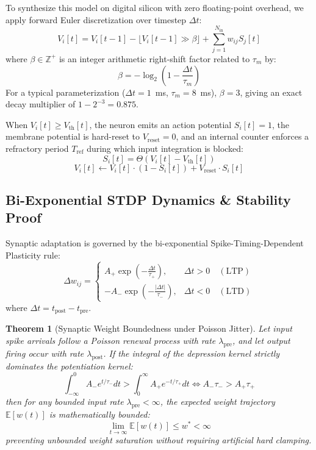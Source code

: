 \documentclass[journal]{IEEEtran}
\newtheorem{theorem}{Theorem}
\theoremstyle{definition}
\begin{document}
To synthesize this model on digital silicon with zero floating-point overhead, we apply forward Euler discretization over timestep $\Delta t$:
\begin{equation}
V_i[t] = V_i[t-1] - \lfloor V_i[t-1] \gg \beta \rfloor + \sum_{j=1}^{N_{\text{in}}} w_{ij} S_j[t]
\label{eq:lif_disc}
\end{equation}
where $\beta \in \mathbb{Z}^+$ is an integer arithmetic right-shift factor related to $\tau_m$ by:
\begin{equation}
\beta = -\log_2\left(1 - \frac{\Delta t}{\tau_m}\right)
\end{equation}
For a typical parameterization ($\Delta t = 1$~ms, $\tau_m = 8$~ms), $\beta = 3$, giving an exact decay multiplier of $1 - 2^{-3} = 0.875$.

When $V_i[t] \ge V_{\text{th}}[t]$, the neuron emits an action potential $S_i[t] = 1$, the membrane potential is hard-reset to $V_{\text{reset}} = 0$, and an internal counter enforces a refractory period $T_{\text{ref}}$ during which input integration is blocked:
\begin{equation}
S_i[t] = \Theta\left(V_i[t] - V_{\text{th}}[t]\right)
\end{equation}
\begin{equation}
V_i[t] \leftarrow V_i[t] \cdot (1 - S_i[t]) + V_{\text{reset}} \cdot S_i[t]
\end{equation}

\subsection{Bi-Exponential STDP Dynamics & Stability Proof}
Synaptic adaptation is governed by the bi-exponential Spike-Timing-Dependent Plasticity rule:
\begin{equation}
\Delta w_{ij} = \begin{cases} 
A_+ \exp\left(-\frac{\Delta t}{\tau_+}\right), & \Delta t > 0 \quad (\text{LTP}) \\ 
-A_- \exp\left(-\frac{|\Delta t|}{\tau_-}\right), & \Delta t < 0 \quad (\text{LTD}) 
\end{cases}
\label{eq:stdp}
\end{equation}
where $\Delta t = t_{\text{post}} - t_{\text{pre}}$.

\begin{theorem}[Synaptic Weight Boundedness under Poisson Jitter]
Let input spike arrivals follow a Poisson renewal process with rate $\lambda_{\text{pre}}$, and let output firing occur with rate $\lambda_{\text{post}}$. If the integral of the depression kernel strictly dominates the potentiation kernel:
\begin{equation}
\int_{-\infty}^0 A_- e^{t/\tau_-} dt > \int_0^\infty A_+ e^{-t/\tau_+} dt \iff A_- \tau_- > A_+ \tau_+
\end{equation}
then for any bounded input rate $\lambda_{\text{pre}} < \infty$, the expected weight trajectory $\mathbb{E}[w(t)]$ is mathematically bounded:
\begin{equation}
\lim_{t \to \infty} \mathbb{E}[w(t)] \le w^* < \infty
\end{equation}
preventing unbounded weight saturation without requiring artificial hard clamping.
\end{theorem}
\end{document}
